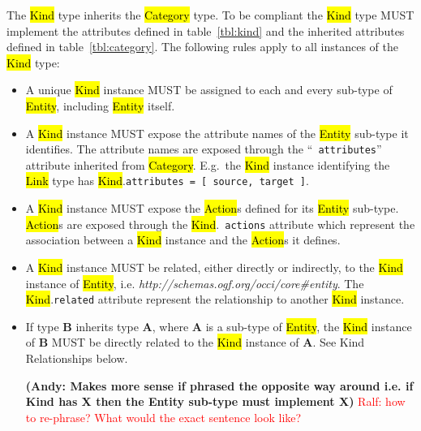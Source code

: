 \documentclass[10pt,a4paper]{article}
\newcommand{\ralf}[1]{\textcolor{red}{Ralf: #1}}
\begin{document}
The \hl{Kind} type inherits the \hl{Category} type. To be compliant the \hl{Kind}
type MUST implement the attributes defined in table~\ref{tbl:kind} and the inherited
attributes defined in table~\ref{tbl:category}. The following rules apply to all
instances of the \hl{Kind} type:
\begin{itemize}
\item A unique \hl{Kind} instance MUST be assigned to each and every sub-type
 of \hl{Entity}, including \hl{Entity} itself.
\item A \hl{Kind} instance MUST expose the attribute names of the \hl{Entity}
 sub-type it identifies. The attribute names are exposed through the ``{\tt
 attributes}'' attribute inherited from \hl{Category}. E.g.~the \hl{Kind}
 instance identifying the \hl{Link} type has \hl{Kind}.{\tt attributes =
 [ source, target ]}.
\item A \hl{Kind} instance MUST expose the \hl{Action}s defined for its
 \hl{Entity} sub-type. \hl{Action}s are exposed through the \hl{Kind}.{\tt
 actions} attribute which represent the association between a \hl{Kind}
 instance and the \hl{Action}s it defines.
\item A \hl{Kind} instance MUST be related, either directly or indirectly, to
 the \hl{Kind} instance of \hl{Entity},
 i.e. \textit{http://schemas.ogf.org/occi/core\#entity}.
 The \hl{Kind}.{\tt related} attribute represent the relationship to another
 \hl{Kind} instance.
\item If type {\bf B} inherits type {\bf A}, where {\bf A} is a sub-type of
 \hl{Entity}, the \hl{Kind} instance of {\bf B} MUST be directly related to the
 \hl{Kind} instance of {\bf A}. See Kind Relationships below.

 \textbf{(Andy: Makes more sense if phrased 
 the opposite way around i.e. if Kind has X then the Entity sub-type must implement X)}
 \ralf{how to re-phrase? What would the exact sentence look like?}
\end{itemize}
\end{document}
